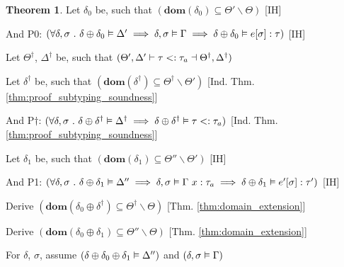 \documentclass[acmsmall]{acmart}
\theoremstyle{definition}
\newtheorem{theorem}{Theorem}[section]
\begin{document}
\begin{theorem}
  \item \I \N Let $\delta_0$ be, such that $(
    \textbf{dom}(\delta_0) \subseteq \Theta' \backslash \Theta
  )$ [IH]
  \item \I \N And P0: $(
    \forall \delta, \sigma \ .\  
    \delta \oplus \delta_0 \vDash \Delta' \implies
    \delta, \sigma \vDash \Gamma \implies
    \delta \oplus \delta_0 \vDash e[\sigma] : \tau
  )$ [IH]

  \item \I \N Let $\Theta^\dagger$, $\Delta^\dagger$ be, such that $(
    \Theta', \Delta' \vdash \tau <: \tau_a \dashv \Theta^\dagger, \Delta^\dagger
  )$

  \item \I \N Let $\delta^\dagger$ be, such that $(
    \textbf{dom}(\delta^\dagger) \subseteq \Theta^\dagger \backslash \Theta'
  )$ [Ind. Thm. \ref{thm:proof_subtyping_soundness}]
  \item \I \N And P$\dagger$: $(
    \forall \delta, \sigma \ .\  
    \delta \oplus \delta^\dagger \vDash \Delta^\dagger \implies
    \delta \oplus \delta^\dagger \vDash \tau <: \tau_a
  )$ [Ind. Thm. \ref{thm:proof_subtyping_soundness}]

  \item \I \N Let $\delta_1$ be, such that $(
    \textbf{dom}(\delta_1) \subseteq \Theta'' \backslash \Theta'
  )$ [IH]
  \item \I \N And P1: $(
    \forall \delta, \sigma \ .\  
    \delta \oplus \delta_1 \vDash \Delta'' \implies
    \delta, \sigma \vDash \Gamma\ x : \tau_a \implies
    \delta \oplus \delta_1 \vDash e'[\sigma] : \tau'
  )$ [IH]


  \item \I \N Derive $(
    \textbf{dom}(\delta_0 \oplus \delta^\dagger) \subseteq \Theta^\dagger \backslash \Theta
  )$ [Thm. \ref{thm:domain_extension}]

  \item \I \N Derive $(
    \textbf{dom}(\delta_0 \oplus \delta_1) \subseteq \Theta'' \backslash \Theta
  )$ [Thm. \ref{thm:domain_extension}]


  \item \I \N For $\delta$, $\sigma$,
    assume $(\delta \oplus \delta_0 \oplus \delta_1 \vDash \Delta'')$
    and $(\delta, \sigma \vDash \Gamma)$


\end{theorem}
\end{document}
